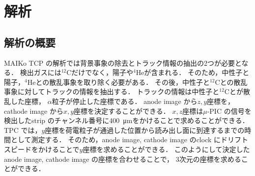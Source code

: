 \documentclass[../master]{subfiles}
\begin{document}
\chapter{解析}
%
%
%
\section{解析の概要}
MAIKo TCP の解析では背景事象の除去とトラック情報の抽出の2つが必要となる．
検出ガスには${}^{12}\mathrm{C}$だけでなく，陽子や${}^{4}\mathrm{He}$が含まれる．
そのため，中性子と陽子，${}^{4}\mathrm{He}$との散乱事象を取り除く必要がある．
その後，中性子と${}^{12}\mathrm{C}$との散乱事象に対してトラックの情報を抽出する．
トラックの情報は中性子と${}^{12}\mathrm{C}$とが散乱した座標，
$\alpha$粒子が停止した座標である．
anode image から$z, y$座標を，cathode image から$x, y$座標を決定することができる．
$x, z$座標は$\mu$-PIC の信号を検出したstrip のチャンネル番号に\SI{400}{\micro\metre}をかけることで求めることができる．
TPC では，$y$座標を荷電粒子が通過した位置から読み出し面に到達するまでの時間として測定する．
そのため，anode image, cathode image のclock にドリフトスピードをかけることで$y$座標を求めることができる．
このようにして決定したanode image, cathode image の座標を合わせることで，
3次元の座標を求めることができる．
\end{document}
